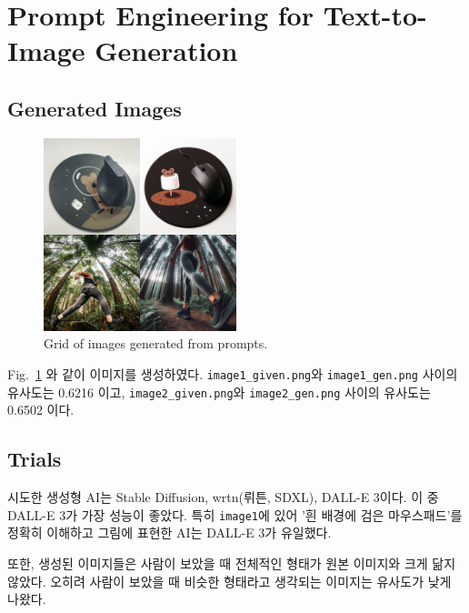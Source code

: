 \section{Prompt Engineering for Text-to-Image Generation}

\subsection{Generated Images}

\begin{figure}[h]
    \centering
    \includegraphics[width=0.5\textwidth]{imgs/p1_grid.png}
    \caption{Grid of images generated from prompts.}
    \label{fig:p1_grid}
\end{figure}

Fig.~\ref{fig:p1_grid} 와 같이 이미지를 생성하였다.
\texttt{image1\_given.png}와 \texttt{image1\_gen.png} 사이의 유사도는 0.6216 이고,
\texttt{image2\_given.png}와 \texttt{image2\_gen.png} 사이의 유사도는 0.6502 이다.

\subsection{Trials}

시도한 생성형 AI는 Stable Diffusion, wrtn(뤼튼, SDXL), DALL-E 3이다.
이 중 DALL-E 3가 가장 성능이 좋았다. 특히 \texttt{image1}에 있어 '흰 배경에 검은 마우스패드'를
정확히 이해하고 그림에 표현한 AI는 DALL-E 3가 유일했다.

또한, 생성된 이미지들은 사람이 보았을 때 전체적인 형태가 원본 이미지와 크게 닮지 않았다.
오히려 사람이 보았을 때 비슷한 형태라고 생각되는 이미지는 유사도가 낮게 나왔다.
